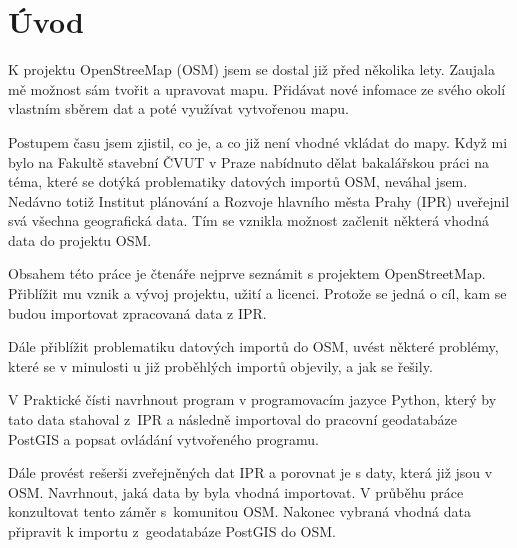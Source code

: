 \chapter{Úvod}
\label{1-uvod}


K projektu OpenStreeMap (OSM) jsem se dostal již před několika lety.
Zaujala mě možnost sám tvořit a upravovat mapu.
Přidávat nové infomace ze svého okolí vlastním sběrem dat
a poté využívat vytvořenou mapu.

Postupem času jsem zjistil, co je, a co již není vhodné vkládat do mapy.
Když mi bylo na Fakultě stavební ČVUT v Praze nabídnuto dělat
bakalářskou práci na téma, které se dotýká problematiky datových importů OSM,
neváhal jsem. Nedávno totiž Institut plánování a Rozvoje hlavního města Prahy
(IPR) uveřejnil svá všechna geografická data.
Tím se vznikla možnost začlenit některá vhodná data do projektu OSM.

Obsahem této práce je čtenáře nejprve seznámit s projektem
OpenStreetMap. Přiblížit mu vznik a vývoj projektu, užití a licenci.
Protože se jedná o cíl, kam se budou importovat zpracovaná data z IPR.

Dále přiblížit problematiku datových importů do OSM, uvést některé
problémy, které se v minulosti u již proběhlých importů objevily,
a jak se řešily.

V Praktické čísti navrhnout program v programovacím jazyce Python,
který by tato data stahoval z~IPR a následně importoval do pracovní
geodatabáze PostGIS a popsat ovládání vytvořeného programu.

Dále provést rešerši zveřejněných dat IPR a porovnat je s daty, která
již jsou v OSM. Navrhnout, jaká data by byla vhodná importovat.
V průběhu práce konzultovat tento záměr s~komunitou OSM.
Nakonec vybraná vhodná data připravit k importu z~geodatabáze PostGIS
do OSM.
